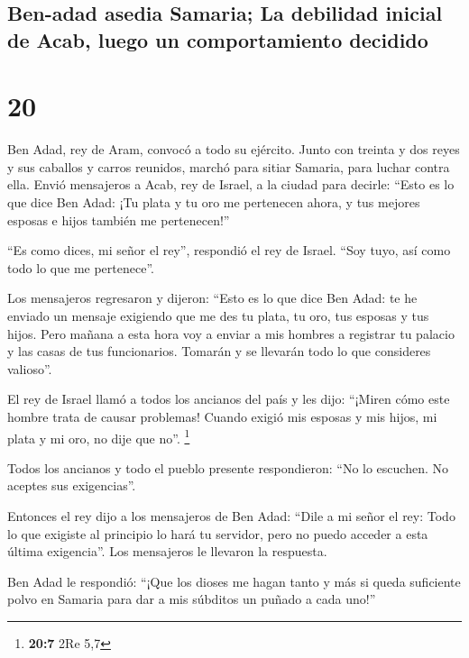 \hypertarget{ben-adad-asedia-samaria-la-debilidad-inicial-de-acab-luego-un-comportamiento-decidido}{%
\subsection{Ben-adad asedia Samaria; La debilidad inicial de Acab, luego
un comportamiento
decidido}\label{ben-adad-asedia-samaria-la-debilidad-inicial-de-acab-luego-un-comportamiento-decidido}}

\hypertarget{section-19}{%
\section{20}\label{section-19}}

 Ben Adad, rey de Aram, convocó a todo su ejército. Junto
con treinta y dos reyes y sus caballos y carros reunidos, marchó para
sitiar Samaria, para luchar contra ella.  Envió mensajeros
a Acab, rey de Israel, a la ciudad para decirle: ``Esto es lo que dice
Ben Adad:  ¡Tu plata y tu oro me pertenecen ahora, y tus
mejores esposas e hijos también me pertenecen!''

 ``Es como dices, mi señor el rey'', respondió el rey de
Israel. ``Soy tuyo, así como todo lo que me pertenece''.

 Los mensajeros regresaron y dijeron: ``Esto es lo que
dice Ben Adad: te he enviado un mensaje exigiendo que me des tu plata,
tu oro, tus esposas y tus hijos.  Pero mañana a esta hora
voy a enviar a mis hombres a registrar tu palacio y las casas de tus
funcionarios. Tomarán y se llevarán todo lo que consideres valioso''.

 El rey de Israel llamó a todos los ancianos del país y
les dijo: ``¡Miren cómo este hombre trata de causar problemas! Cuando
exigió mis esposas y mis hijos, mi plata y mi oro, no dije que no''.
\footnote{\textbf{20:7} 2Re 5,7}

 Todos los ancianos y todo el pueblo presente
respondieron: ``No lo escuchen. No aceptes sus exigencias''.

 Entonces el rey dijo a los mensajeros de Ben Adad: ``Dile
a mi señor el rey: Todo lo que exigiste al principio lo hará tu
servidor, pero no puedo acceder a esta última exigencia''. Los
mensajeros le llevaron la respuesta.

 Ben Adad le respondió: ``¡Que los dioses me hagan tanto
y más si queda suficiente polvo en Samaria para dar a mis súbditos un
puñado a cada uno!''

